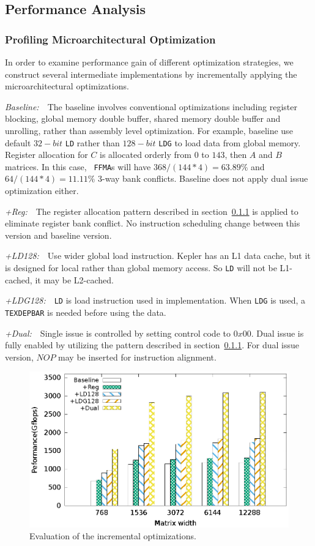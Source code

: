 \documentclass{sig-alternate-05-2015}
\begin{document}
\subsection{Performance Analysis}

\subsubsection{Profiling Microarchitectural Optimization}
In order to examine performance gain of different optimization strategies, we construct several intermediate implementations by incrementally applying the microarchitectural optimizations.

{\it Baseline:}~~The baseline involves conventional optimizations including register blocking, global
memory double buffer, shared memory double buffer and unrolling, rather than assembly level optimization.
For example, baseline use default $32-bit$ {\tt LD} rather than $128-bit$ {\tt LDG} to load data from global memory.
Register allocation for $C$ is allocated orderly from $0$ to $143$, then $A$ and $B$ matrices. In this case, {\tt
FFMA}s will have $368/(144*4)=63.89\%$ and $64/(144*4)=11.11\%$ 3-way bank conflicts. Baseline does not apply dual
issue optimization either.

{\it +Reg:}~~The register allocation pattern described in section~\ref{} is applied to eliminate register bank conflict. No
instruction scheduling change between this version and baseline version.

{\it +LD128:}~~Use wider global load instruction.
Kepler has an L1 data cache, but it is designed for local rather than global memory access. So {\tt LD} will not be L1-cached, it may be L2-cached.

{\it +LDG128:}~~{\tt LD} is load instruction used in implementation. When {\tt LDG} is used, a {\tt TEXDEPBAR} is needed before using the data.

{\it +Dual:}~~Single issue is controlled by setting control code to $0x00$. Dual issue is fully enabled by utilizing the pattern described in section~\ref{}. For dual issue version, $NOP$ may be inserted for instruction alignment.

\begin{figure}[htbp]
\begin{center}
\includegraphics[scale=0.65]{tn_prof}
    \caption{Evaluation of the incremental optimizations.}
\label{fig:th_prof}
\end{center}
\end{figure}
\end{document}
